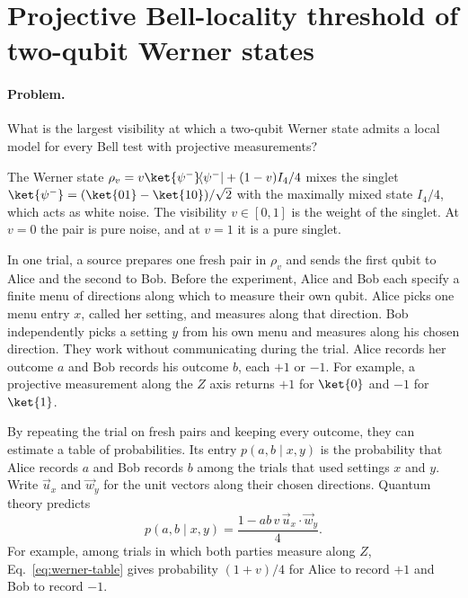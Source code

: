 \section{Projective Bell-locality threshold of two-qubit Werner states}
\label{sec:op_f481af11654b3f28}

\paragraph{Problem.}
What is the largest visibility at which a two-qubit Werner state admits a local model for every Bell test with projective measurements?

The Werner state $\rho_v=v\ket{\psi^-}\!\langle\psi^-\rvert+(1-v)I_4/4$ mixes the singlet $\ket{\psi^-}=(\ket{01}-\ket{10})/\sqrt2$ with the maximally mixed state $I_4/4$, which acts as white noise. The visibility $v\in[0,1]$ is the weight of the singlet. At $v=0$ the pair is pure noise, and at $v=1$ it is a pure singlet.

In one trial, a source prepares one fresh pair in $\rho_v$ and sends the first qubit to Alice and the second to Bob. Before the experiment, Alice and Bob each specify a finite menu of directions along which to measure their own qubit. Alice picks one menu entry $x$, called her setting, and measures along that direction. Bob independently picks a setting $y$ from his own menu and measures along his chosen direction. They work without communicating during the trial. Alice records her outcome $a$ and Bob records his outcome $b$, each $+1$ or $-1$. For example, a projective measurement along the $Z$ axis returns $+1$ for $\ket{0}$ and $-1$ for $\ket{1}$.

By repeating the trial on fresh pairs and keeping every outcome, they can estimate a table of probabilities. Its entry $p(a,b\mid x,y)$ is the probability that Alice records $a$ and Bob records $b$ among the trials that used settings $x$ and $y$. Write $\vec{u}_x$ and $\vec{w}_y$ for the unit vectors along their chosen directions. Quantum theory predicts
\begin{equation}
p(a,b\mid x,y)=\frac{1-ab\,v\,\vec{u}_x\cdot\vec{w}_y}{4}.
\label{eq:werner-table}
\end{equation}
For example, among trials in which both parties measure along $Z$, Eq.~\eqref{eq:werner-table} gives probability $(1+v)/4$ for Alice to record $+1$ and Bob to record $-1$.

